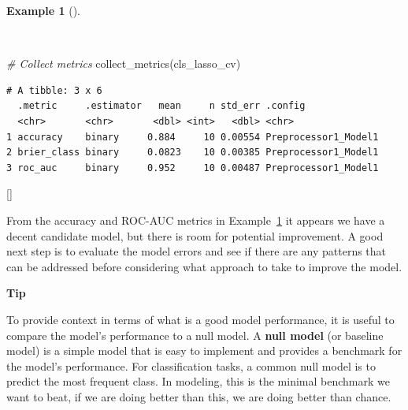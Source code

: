 \documentclass[
  letterpaper,
  krantz1]{latex/krantz-mod}
\newenvironment{Shaded}{\begin{snugshade}}{\end{snugshade}}
\newcommand{\CommentTok}[1]{\textcolor[rgb]{0.00,0.00,0.00}{\textit{#1}}}
\newcommand{\FunctionTok}[1]{\textcolor[rgb]{0.00,0.00,0.00}{#1}}
\newcommand{\NormalTok}[1]{\textcolor[rgb]{0.00,0.00,0.00}{#1}}
\newcommand{\cindex}[1]{%
  \StrSubstitute{#1}{_}{\_}[\temp]%
  \index{\temp}%
}
\theoremstyle{definition}
\theoremstyle{definition}
\newtheorem{example}{Example}[chapter]
\theoremstyle{remark}
\begin{document}
\pagebreak

\begin{example}[]\protect\hypertarget{exm-predict-class-tune-hyperparameters-evaluate-workflow-cv-collect}{}\label{exm-predict-class-tune-hyperparameters-evaluate-workflow-cv-collect}

~

\begin{Shaded}
\begin{Highlighting}[numbers=left,,]
\CommentTok{\# Collect metrics}
\FunctionTok{collect\_metrics}\NormalTok{(cls\_lasso\_cv)}
\end{Highlighting}
\end{Shaded}

\begin{verbatim}
# A tibble: 3 x 6
  .metric     .estimator   mean     n std_err .config             
  <chr>       <chr>       <dbl> <int>   <dbl> <chr>               
1 accuracy    binary     0.884     10 0.00554 Preprocessor1_Model1
2 brier_class binary     0.0823    10 0.00385 Preprocessor1_Model1
3 roc_auc     binary     0.952     10 0.00487 Preprocessor1_Model1
\end{verbatim}

\cindex{collect_metrics()}

\end{example}

From the accuracy and ROC-AUC metrics in
Example~\ref{exm-predict-class-tune-hyperparameters-evaluate-workflow-cv-collect}
it appears we have a decent candidate model, but there is room for
potential improvement. A good next step is to evaluate the model errors
and see if there are any patterns that can be addressed before
considering what approach to take to improve the model.

\begin{tcolorbox}[enhanced jigsaw, toprule=.15mm, breakable, colback=white, arc=.35mm, left=2mm, colframe=quarto-callout-color-frame, opacityback=0, bottomrule=.15mm, rightrule=.15mm, leftrule=.75mm]

\textbf{ Tip}

To provide context in terms of what is a good model performance, it is
useful to compare the model's performance to a null model. A
\textbf{null model} (or baseline model) is a simple
model that is easy to implement and provides a benchmark for the model's
performance. For classification tasks, a
common null model is to predict the most frequent class. In modeling,
this is the minimal benchmark we want to beat, if we are doing better
than this, we are doing better than chance.

\end{tcolorbox}
\end{document}

